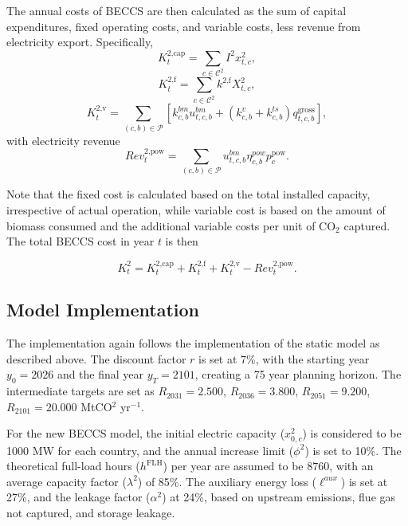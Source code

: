 The annual costs of BECCS are then calculated as the sum of capital expenditures, fixed operating costs, and variable costs, less revenue from electricity export. Specifically,
\begin{equation}
K_t^\text{2,cap} = \sum_{c \in \mathcal{C}^2} I^2x_{t,c}^2,
\end{equation}
\begin{equation}
K_t^\text{2,f} = \sum_{c \in \mathcal{C}^2} k^\text{2,f}X_{t,c}^2,
\end{equation}
\begin{equation}
K_t^\text{2,v} = \sum_{(c,b) \in \mathcal{P}} \left[ k_{c,b}^{bm}u_{t,c,b}^{bm} + \left( k_{c,b}^v + k_{c,b}^{ts} \right) q_{t,c,b}^\text{gross} \right],
\end{equation}
with electricity revenue
\begin{equation}
Rev_t^\text{2,pow} = \sum_{(c,b) \in \mathcal{P}} u_{t,c,b}^{bm} \eta_{c,b}^{pow} p_c^\text{pow}.
\end{equation}

Note that the fixed cost is calculated based on the total installed capacity, irrespective of actual operation, while variable cost is based on the amount of biomass consumed and the additional variable costs per unit of CO$_2$ captured. The total BECCS cost in year $t$ is then

\begin{equation}
K_t^2 = K_t^{\text{2,cap}} + K_t^{\text{2,f}} + K_t^{\text{2,v}}- Rev_t^{\text{2,pow}}.
\end{equation}

\subsection{Model Implementation}

The implementation again follows the implementation of the static model as described above. The discount factor $r$ is set at 7\%, with the starting year $y_0 = 2026$ and the final year $y_T = 2101$, creating a 75 year planning horizon. The intermediate targets are set as $R_{2031} = 2.500$, $R_{2036} = 3.800$, $R_{2051} = 9.200$, $R_{2101} = 20.000$ MtCO$^2$ yr$^{-1}$.\vspace{2mm}

For the new BECCS model, the initial electric capacity ($x_{0,c}^2$) is considered to be 1000 MW for each country, and the annual increase limit ($\phi^2$) is set to 10\%. The theoretical full-load hours ($h^\text{FLH}$) per year are assumed to be 8760, with an average capacity factor ($\lambda^2$) of 85\%. The auxiliary energy loss ($\ell^{aux}$) is set at 27\%, and the leakage factor ($\alpha^2$) at 24\%, based on upstream emissions, flue gas not captured, and storage leakage.\vspace{2mm}


